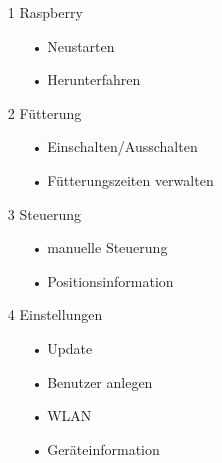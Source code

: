 \begin{itemize}
\item[1] Raspberry
\begin{itemize}
\item[•] Neustarten
\item[•] Herunterfahren
\end{itemize}
\item[2] Fütterung
\begin{itemize}
\item[•] Einschalten/Ausschalten
\item[•] Fütterungszeiten verwalten
\end{itemize}
\item[3] Steuerung
\begin{itemize}
\item[•] manuelle Steuerung
\item[•] Positionsinformation
\end{itemize}
\item[4] Einstellungen
\begin{itemize}
\item[•] Update
\item[•] Benutzer anlegen
\item[•] WLAN
\item[•] Geräteinformation
\end{itemize}
\end{itemize}

\vspace{10pt}

